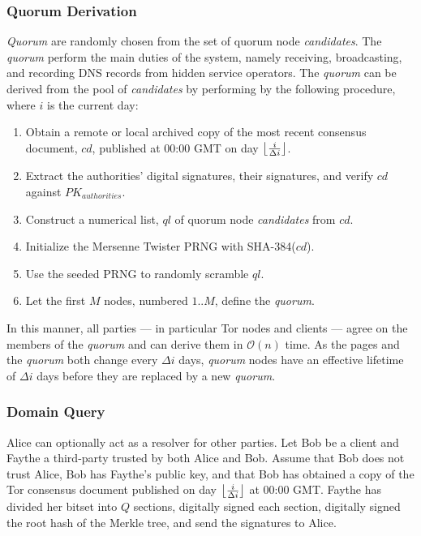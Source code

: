\subsubsection{Quorum Derivation}
\label{sec:QuorumDerivation}

\emph{Quorum} are randomly chosen from the set of quorum node \emph{candidates}. The \emph{quorum} perform the main duties of the system, namely receiving, broadcasting, and recording DNS records from hidden service operators. The \emph{quorum} can be derived from the pool of \emph{candidates} by performing by the following procedure, where $ i $ is the current day:

\begin{enumerate}
	\item Obtain a remote or local archived copy of the most recent consensus document, $ cd $, published at 00:00 GMT on day $ \floor[\big]{\frac{i}{\Delta i}} $.
	\item Extract the authorities' digital signatures, their signatures, and verify $ cd $ against $ PK_{authorities} $.
	\item Construct a numerical list, $ ql $ of quorum node \emph{candidates} from $ cd $.
	\item Initialize the Mersenne Twister PRNG with SHA-384($ cd $).
	\item Use the seeded PRNG to randomly scramble $ ql $.
	\item Let the first $ M $ nodes, numbered $ 1 .. M $, define the \emph{quorum}.
\end{enumerate}

In this manner, all parties --- in particular Tor nodes and clients --- agree on the members of the \emph{quorum} and can derive them in $ \mathcal{O}(n) $ time. As the pages and the \emph{quorum} both change every $ \Delta i $ days, \emph{quorum} nodes have an effective lifetime of $ \Delta i $ days before they are replaced by a new \emph{quorum}.



\subsubsection{Domain Query}
\label{sec:DomainQuery}

Alice can optionally act as a resolver for other parties. Let Bob be a client and Faythe a third-party trusted by both Alice and Bob. Assume that Bob does not trust Alice, Bob has Faythe's public key, and that Bob has obtained a copy of the Tor consensus document published on day $ \floor[\big]{\frac{i}{\Delta i}} $ at 00:00 GMT. Faythe has divided her bitset into $ Q $ sections, digitally signed each section, digitally signed the root hash of the Merkle tree, and send the signatures to Alice.

